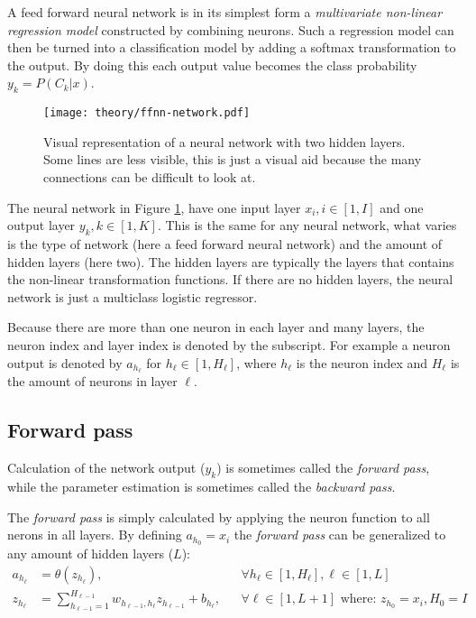 A feed forward neural network is in its simplest form a \textit{multivariate non-linear regression model} constructed by combining neurons. Such a regression model can then be turned into a classification model by adding a softmax transformation \cite{the-elements-of-statistical-learning} to the output. By doing this each output value becomes the class probability $y_k = P(C_k | x)$.

\begin{figure}[h]
	\centering
	\texttt{[image: theory/ffnn-network.pdf]}
	\caption{Visual representation of a neural network with two hidden layers. Some lines are less visible, this is just a visual aid because the many connections can be difficult to look at.}
	\label{fig:theory:ffnn:network}
\end{figure}

The neural network in Figure \ref{fig:theory:ffnn:network}, have one input layer $x_i, i \in [1, I]$ and one output layer $y_k, k \in [1, K]$. This is the same for any neural network, what varies is the type of network (here a feed forward neural network) and the amount of hidden layers (here two). The hidden layers are typically the layers that contains the non-linear transformation functions. If there are no hidden layers, the neural network is just a multiclass logistic regressor\cite{bishop}.

Because there are more than one neuron in each layer and many layers, the neuron index and layer index is denoted by the subscript. For example a neuron output is denoted by $a_{h_{\ell}}$ for $h_{\ell} \in [1, H_{\ell}]$, where $h_{\ell}$ is the neuron index and $H_\ell$ is the amount of neurons in layer $\ell$.

\subsection{Forward pass}

Calculation of the network output ($y_k$) is sometimes called the \textit{forward pass}, while the parameter estimation is sometimes called the \textit{backward pass}.

The \textit{forward pass} is simply calculated by applying the neuron function to all nerons in all layers. By defining $a_{h_0} = x_i$ the \textit{forward pass} can be generalized to any amount of hidden layers ($L$):
\begin{equation}
\begin{aligned}
a_{h_\ell} &= \theta(z_{h_\ell}), && \forall h_{\ell} \in [1, H_{\ell}], \ell \in [1, L] \\
z_{h_\ell} &= \sum_{h_{\ell-1} = 1}^{H_{\ell-1}} w_{h_{\ell-1}, h_{\ell}} z_{h_{\ell-1}} + b_{h_{\ell}}, && \forall \ell \in [1, L+1] \text{ where: } z_{h_0} = x_i, H_0 = I \\
\end{aligned}
\end{equation}

